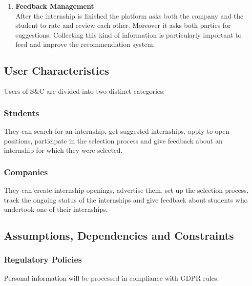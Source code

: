 \begin{enumerate}
        \item \textbf {Feedback Management}
        \\ After the internship is finished the platform asks both the company and the student to rate and review each other. Moreover it asks both parties for suggestions. Collecting this kind of information is particularly important to feed and improve the recommendation system.
    \end{enumerate}



\subsection{User Characteristics}
    Users of S\&C are divided into two distinct categories:



\subsubsection{Students}
    They can search for an internship, get suggested internships, apply to open positions, participate in the selection process and give feedback about an internship for which they were selected.



\subsubsection{Companies}
    They can create internship openings, advertise them, set up the selection process, track the ongoing status of the internships and give feedback about students who undertook one of their internships.



\subsection{Assumptions, Dependencies and Constraints}



\subsubsection{Regulatory Policies}
    Personal information will be processed in compliance with GDPR rules.


